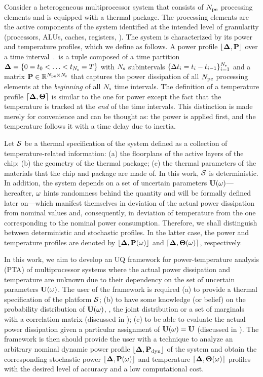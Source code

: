 Consider a heterogeneous multiprocessor system that consists of ${N_\text{pe}}$ processing elements and is equipped with a thermal package. The processing elements are the active components of the system identified at the intended level of granularity (processors, ALUs, caches, registers, \etc). The system is characterized by its power and temperature profiles, which we define as follows. A power profile $\profP$ over a time interval $\period$ is a tuple composed of a time partition $\boldsymbol{\Delta} = \{ 0 = t_0 < \dotsc < t_{N_\text{s}} = T \}$ with $N_\text{s}$ subintervals $\{ \Delta t_i = t_i - t_{i - 1} \}_{i = 1}^{N_\text{s}}$ and a matrix $\mP \in \real^{\cores \times \steps}$ that captures the power dissipation of all ${N_\text{pe}}$ processing elements at the \emph{beginning} of all $N_\text{s}$ time intervals. The definition of a temperature profile $\profT$ is similar to the one for power except the fact that the temperature is tracked at the \emph{end} of the time intervals. This distinction is made merely for convenience and can be thought as: the power is applied first, and the temperature follows it with a time delay due to inertia.

Let $\mathcal{S}$ be a thermal specification of the system defined as a collection of temperature-related information: (a) the floorplans of the active layers of the chip; (b) the geometry of the thermal package; (c) the thermal parameters of the materials that the chip and package are made of. In this work, $\mathcal{S}$ is deterministic. In addition, the system depends on a set of uncertain parameters $\mathbf{U}(\omega)$---hereafter, $\omega$ hints randomness behind the quantity and will be formally defined later on---which manifest themselves in deviation of the actual power dissipation from nominal values and, consequently, in deviation of temperature from the one corresponding to the nominal power consumption. Therefore, we shall distinguish between deterministic and stochastic profiles. In the latter case, the power and temperature profiles are denoted by $\profP{\o}$ and $\profT{\o}$, respectively.

In this work, we aim to develop an UQ framework for power-temperature analysis (PTA) of multiprocessor systems where the actual power dissipation and temperature are unknown due to their dependency on the set of uncertain parameters $\mathbf{U}(\omega)$. The user of the framework is required (a) to provide a thermal specification of the platform $\mathcal{S}$; (b) to have some knowledge (or belief) on the probability distribution of $\mathbf{U}(\omega)$, \eg, the joint distribution or a set of marginals with a correlation matrix (discussed in ); (c) to be able to evaluate the actual power dissipation given a particular assignment of $\mathbf{U}(\omega) = \mathbf{U}$ (discussed in ). The framework is then should provide the user with a technique to analyze an arbitrary nominal dynamic power profile $\profPdyn$ of the system and obtain the corresponding stochastic power $\profP{\o}$ and temperature $\profT{\o}$ profiles with the desired level of accuracy and a low computational cost.

